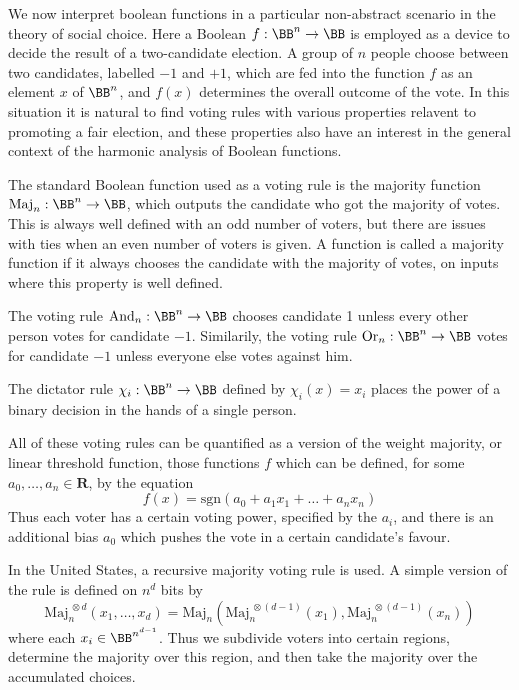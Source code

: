 We now interpret boolean functions in a particular non-abstract scenario in the theory of social choice. Here a Boolean $f: \BB^n \to \BB$ is employed as a device to decide the result of a two-candidate election. A group of $n$ people choose between two candidates, labelled $-1$ and $+1$, which are fed into the function $f$ as an element $x$ of $\BB^n$, and $f(x)$ determines the overall outcome of the vote. In this situation it is natural to find voting rules with various properties relavent to promoting a fair election, and these properties also have an interest in the general context of the harmonic analysis of Boolean functions.

\begin{example}
    The standard Boolean function used as a voting rule is the majority function $\text{Maj}_n: \BB^n \to \BB$, which outputs the candidate who got the majority of votes. This is always well defined with an odd number of voters, but there are issues with ties when an even number of voters is given. A function is called a majority function if it always chooses the candidate with the majority of votes, on inputs where this property is well defined.
\end{example}

\begin{example}
    The voting rule $\text{And}_n: \BB^n \to \BB$ chooses candidate 1 unless every other person votes for candidate $-1$. Similarily, the voting rule $\text{Or}_n: \BB^n \to \BB$ votes for candidate $-1$ unless everyone else votes against him.
\end{example}

\begin{example}
    The dictator rule $\chi_i: \BB^n \to \BB$ defined by $\chi_i(x) = x_i$ places the power of a binary decision in the hands of a single person.
\end{example}

\begin{example}
    All of these voting rules can be quantified as a version of the weight majority, or linear threshold function, those functions $f$ which can be defined, for some $a_0, \dots, a_n \in \mathbf{R}$, by the equation
    \[ f(x) = \text{sgn}(a_0 + a_1x_1 + \dots + a_nx_n) \]
    Thus each voter has a certain voting power, specified by the $a_i$, and there is an additional bias $a_0$ which pushes the vote in a certain candidate's favour.
\end{example}

\begin{example}
    In the United States, a recursive majority voting rule is used. A simple version of the rule is defined on $n^d$ bits by
    \[ \text{Maj}_n^{\ \otimes d}(x_1, \dots, x_d) = \text{Maj}_n(\text{Maj}^{\ \otimes (d-1)}_n(x_1), \text{Maj}^{\ \otimes (d-1)}_n(x_n)) \]
    where each $x_i \in \BB^{n^{d-1}}$. Thus we subdivide voters into certain regions, determine the majority over this region, and then take the majority over the accumulated choices.
\end{example}

